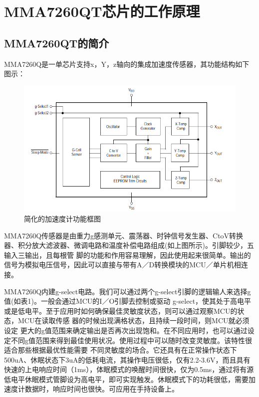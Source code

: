 \section{MMA7260QT芯片的工作原理}

\subsection{MMA7260QT的简介}
\par{MMA7260Q是一单芯片支持x，Y，z轴向的集成加速度传感器，其功能结构如下图示：}

\begin{figure}[H]
\centering
\includegraphics[width=12cm]{figure/lab2.1.1.png}
\caption{简化的加速度计功能框图} \label{fig:2.1.1}
\end{figure}

\par{MMA7260Q传感器是由重力g感测单元、震荡器、时钟信号发生器、CtoV转换器、积分放大滤波器、微调电路和温度补偿电路组成(如上图所示)。引脚较少，五输入三输出，且每根管 脚的功能和作用容易理解，因此使用起来很简单。输出的信号为模拟电压信号，因此可以直接与带有A／D转换模块的MCU／单片机相连接。}
\par{MMA7260Q内建g-select电路。我们可以通过两个g-select引脚的逻辑输人来选择g值(如表1)。一般会通过MCU的I／O引脚去控制或驱动 g-select，使其处于高电平或是低电平。至于应用时如何确保最佳灵敏度状态，则可以通过观察MCU的状态，MCU在读取传感 器的时候出现满格状态，且持续一段时间，则MCU就必须设定 更大的g值范围来确定输出是否再次出现饱和。在不同应用时，也可以通过设定不同g值范围来得到最佳使用状况。使用过程中可以随时改变灵敏度。该特性很适合那些根据最优性能需要 不同灵敏度的场合。它还具有在正常操作状态下500uA、休眠状态下3uA的低耗电流，其操作电压很低，仅有2.2-3.6V，而且具有快速的上电响应时间（1ms），体眠模式的唤醒时间很快，仅为0.5ms，通过将有源低电平休眠模式管脚设为高电平，即可实现触发。休眠模式下的功耗很低，需要加速度计数据时，响应时间也很快。可应用在手持设备上。}

